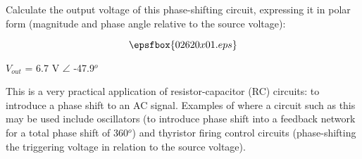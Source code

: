 

Calculate the output voltage of this phase-shifting circuit, expressing it in polar form (magnitude and phase angle relative to the source voltage):

$$\epsfbox{02620x01.eps}$$







$V_{out}$ = 6.7 V $\angle$ -47.9$^{o}$







This is a very practical application of resistor-capacitor (RC) circuits: to introduce a phase shift to an AC signal.  Examples of where a circuit such as this may be used include oscillators (to introduce phase shift into a feedback network for a total phase shift of 360$^{o}$) and thyristor firing control circuits (phase-shifting the triggering voltage in relation to the source voltage).




